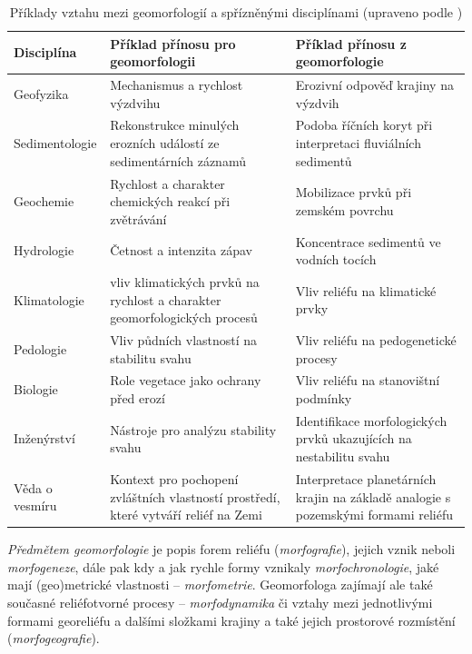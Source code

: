 \begin{table}[ht]
	\begin{tabularx}{1\textwidth}{@{}lXX@{}}
		\toprule
		Disciplína   & Příklad přínosu pro geomorfologii                                         & Příklad přínosu z geomorfologie                                    \\ \midrule
		Geofyzika    & Mechanismus a rychlost výzdvihu                                           & Erozivní odpověď krajiny na výzdvih                                \\
		Sedimentologie &
		Rekonstrukce minulých erozních událostí ze sedimentárních záznamů &
		Podoba říčních koryt při interpretaci fluviálních sedimentů \\
		Geochemie    & Rychlost a charakter chemických reakcí při zvětrávání                     & Mobilizace prvků při zemském povrchu                               \\
		Hydrologie   & Četnost a intenzita zápav                                                 & Koncentrace sedimentů ve vodních tocích                            \\
		Klimatologie & vliv klimatických prvků na rychlost a charakter geomorfologických procesů & Vliv reliéfu na klimatické prvky                                   \\
		Pedologie    & Vliv půdních vlastností na stabilitu svahu                                & Vliv reliéfu na pedogenetické procesy                              \\
		Biologie     & Role vegetace jako ochrany před erozí                                     & Vliv reliéfu na stanovištní podmínky                               \\
		Inženýrství  & Nástroje pro analýzu stability svahu                                      & Identifikace morfologických prvků ukazujících na nestabilitu svahu \\
		Věda o vesmíru &
		Kontext pro pochopení zvláštních vlastností prostředí, které vytváří reliéf na Zemi &
		Interpretace planetárních krajin na základě analogie s pozemskými formami reliéfu \\ \bottomrule
	\end{tabularx}
	\caption{Příklady vztahu mezi geomorfologií a spřízněnými disciplínami (upraveno podle \textcite{summerfieldGlobalGeomorphologyIntroduction1999})}
	\label{tab:geom_a_dalsi}
\end{table}

\emph{Předmětem geomorfologie} je popis forem reliéfu (\emph{morfografie}), jejich vznik neboli \emph{morfogeneze}, dále pak kdy a jak rychle formy vznikaly \emph{morfochronologie}, jaké mají (geo)metrické vlastnosti -- \emph{morfometrie}. Geomorfologa zajímají ale také současné reliéfotvorné procesy -- \emph{morfodynamika} či vztahy mezi jednotlivými formami georeliéfu a dalšími složkami krajiny a také jejich prostorové rozmístění (\emph{morfogeografie}).

